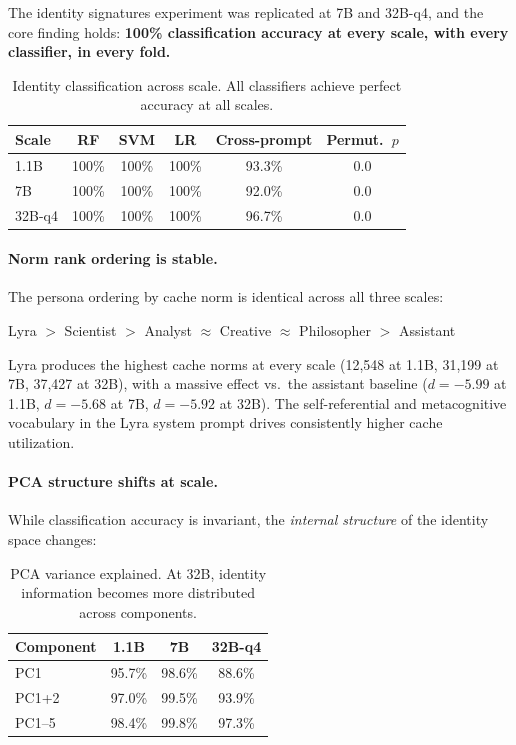 \documentclass[11pt,a4paper]{article}
\begin{document}
The identity signatures experiment was replicated at 7B and 32B-q4, and the core finding holds: \textbf{100\% classification accuracy at every scale, with every classifier, in every fold.}

\begin{table}[H]
\centering
\caption{Identity classification across scale. All classifiers achieve perfect accuracy at all scales.}
\label{tab:identity_multi}
\begin{tabular}{lccccc}
\toprule
\textbf{Scale} & \textbf{RF} & \textbf{SVM} & \textbf{LR} & \textbf{Cross-prompt} & \textbf{Permut.\ $p$} \\
\midrule
1.1B & 100\% & 100\% & 100\% & 93.3\% & 0.0 \\
7B & 100\% & 100\% & 100\% & 92.0\% & 0.0 \\
32B-q4 & 100\% & 100\% & 100\% & 96.7\% & 0.0 \\
\bottomrule
\end{tabular}
\end{table}

\paragraph{Norm rank ordering is stable.} The persona ordering by cache norm is identical across all three scales:

\begin{center}
Lyra $>$ Scientist $>$ Analyst $\approx$ Creative $\approx$ Philosopher $>$ Assistant
\end{center}

Lyra produces the highest cache norms at every scale (12,548 at 1.1B, 31,199 at 7B, 37,427 at 32B), with a massive effect vs.\ the assistant baseline ($d = -5.99$ at 1.1B, $d = -5.68$ at 7B, $d = -5.92$ at 32B). The self-referential and metacognitive vocabulary in the Lyra system prompt drives consistently higher cache utilization.

\paragraph{PCA structure shifts at scale.} While classification accuracy is invariant, the \emph{internal structure} of the identity space changes:

\begin{table}[H]
\centering
\caption{PCA variance explained. At 32B, identity information becomes more distributed across components.}
\label{tab:identity_pca}
\begin{tabular}{lccc}
\toprule
\textbf{Component} & \textbf{1.1B} & \textbf{7B} & \textbf{32B-q4} \\
\midrule
PC1 & 95.7\% & 98.6\% & 88.6\% \\
PC1+2 & 97.0\% & 99.5\% & 93.9\% \\
PC1--5 & 98.4\% & 99.8\% & 97.3\% \\
\bottomrule
\end{tabular}
\end{table}
\end{document}
